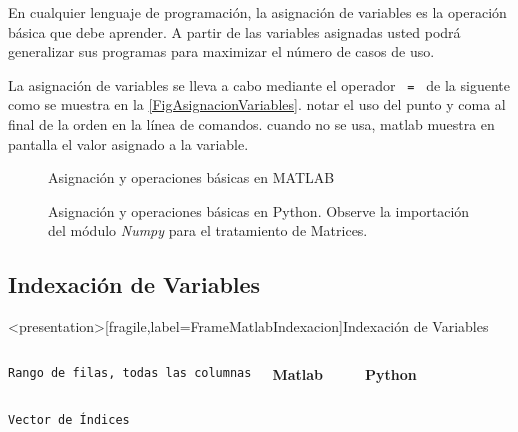   En cualquier lenguaje de programación, la asignación 
  de variables es la operación básica que debe aprender.
  A partir de las variables asignadas usted podrá generalizar sus
  programas para maximizar el número de casos de uso. 

  La asignación de variables se lleva a cabo mediante
  el operador \texttt{ = } de la siguente como se muestra
  en la \autoref{FigAsignacionVariables}. notar el uso 
  del punto y coma al final de la orden en la línea de 
  comandos. cuando no se usa, matlab muestra en pantalla
  el valor asignado a la variable.

\begin{figure}
\caption{Asignación y operaciones básicas en MATLAB\label{FigAsignacionVariables}}
\end{figure}

\begin{figure}
\caption{Asignación y operaciones básicas en Python. Observe la importación del 
        módulo \protect\emph{Numpy} para el tratamiento de Matrices. \protect\label{FigAsignacionVariablesPython}}
\end{figure}

\mode* 

\subsection{Indexación de Variables}

\begin{frame}<presentation>[fragile,label=FrameMatlabIndexacion]{Indexación de Variables}

\begin{columns}[T]
  \vspace{0.5cm}
\flushright \texttt{Rango de filas, todas las columnas}

  \textbf{Matlab}

\begin{codeblock}
  
\end{codeblock}
  \textbf{Python}
\begin{codeblock}
%  
  
\end{codeblock}

\end{columns}
  \vspace{0.5cm}
\begin{columns}[T]
\hfill \texttt{Vector de Índices}

\begin{codeblock}
  
\end{codeblock}

  \begin{codeblock}
    
  \end{codeblock}
\end{columns}
\end{frame}

